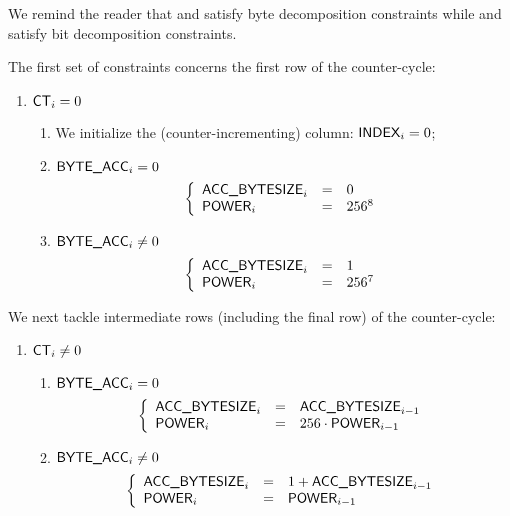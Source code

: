 \begin{center}
\end{center}

We remind the reader that
\genByte{} and \genByteAcc{} satisfy byte decomposition constraints while
\genBit{}  and \genBitAcc{}  satisfy bit  decomposition constraints.

The first set of constraints concerns the first row of the counter-cycle:
\begin{enumerate}
	\item \If $\textsf{CT}_{i}=0$ \Then
		\begin{enumerate}
			\item We initialize the (counter-incrementing) \index{} column: \( \textsf{INDEX}_{i} = 0 \);
			\item \If $\textsf{BYTE}\textsf{\_}\textsf{ACC}_{i} = 0$ \Then 
				\[
					\left\{ \begin{array}{lcl}
						\textsf{ACC\_BYTESIZE}_{i}      & = & 0       \\
						\textsf{POWER}_{i}   & = & 256^{8} \\
					\end{array} \right.
				\]
			\item \If $\textsf{BYTE}\textsf{\_}\textsf{ACC}_{i} \neq 0$ \Then
				\[
					\left\{ \begin{array}{lcl}
						\textsf{ACC\_BYTESIZE}_{i}      & = & 1       \\
						\textsf{POWER}_{i}   & = & 256^{7} \\
					\end{array} \right.
				\]
		\end{enumerate}
\end{enumerate}
We next tackle intermediate rows (including the final row) of the counter-cycle:
\begin{enumerate}[resume]
	\item \If $\textsf{CT}_{i} \neq 0$ \Then
		\begin{enumerate}
			\item \If $\textsf{BYTE}\textsf{\_}\textsf{ACC}_{i} = 0$ \Then
				\[
					\left\{ \begin{array}{lcl}
						\textsf{ACC\_BYTESIZE}_{i}      & = & \textsf{ACC\_BYTESIZE}_{i - 1}              \\
						\textsf{POWER}_{i}   & = & 256 \cdot \textsf{POWER}_{i - 1} \\
					\end{array} \right.
				\]
			\item \If $\textsf{BYTE}\textsf{\_}\textsf{ACC}_{i} \neq 0$ \Then
				\[
					\left\{ \begin{array}{lcl}
						\textsf{ACC\_BYTESIZE}_{i}      & = & 1 + \textsf{ACC\_BYTESIZE}_{i - 1} \\
						\textsf{POWER}_{i}   & = & \textsf{POWER}_{i - 1}  \\
					\end{array} \right.
				\]
		\end{enumerate}
\end{enumerate}
